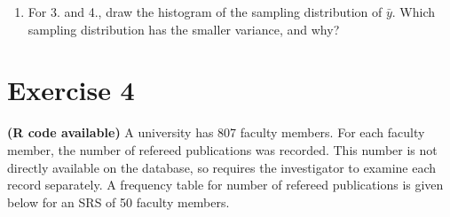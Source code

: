 \documentclass[12pt]{article}
\begin{document}
\begin{enumerate}
\item For 3. and 4., draw the histogram of the sampling distribution of $\bar{y}$. Which sampling distribution has the smaller variance, and why?\\

\end{enumerate}


\section*{Exercise 4}
\textbf{\color{ForestGreen}(R code available)} A university has 807 faculty members. For each faculty member, the number of refereed publications was recorded. This number is not directly available on the database,
so requires the investigator to examine each record separately. A frequency table for number of refereed publications is given below for an SRS of 50 faculty members.
\end{document}
